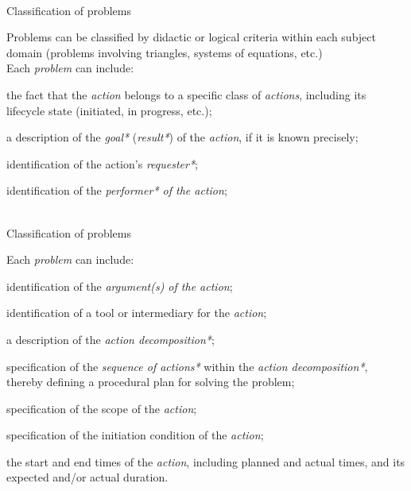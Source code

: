 \begin{frame}{\\Classification of problems}
	\topline
	\justifying

    Problems can be classified by didactic or logical criteria within each subject domain (problems involving triangles, systems of equations, etc.)\\
    \bigskip
    Each \textit{problem} can include:
    \begin{textitemize}
        \item the fact that the \textit{action} belongs to a specific class of \textit{actions}, including its lifecycle state (initiated, in progress, etc.);
        \item a description of the \textit{goal*} (\textit{result*}) of the \textit{action}, if it is known precisely;
        \item identification of the action's \textit{requester*};
        \item identification of the \textit{performer* of the action};
    \end{textitemize}
\end{frame}

\begin{frame}{\\Classification of problems}
	\topline
	\justifying

    \bigskip
    Each \textit{problem} can include:
    \begin{textitemize}
        \item identification of the \textit{argument(s) of the action\scnrolesign};
        \item identification of a tool or intermediary for the \textit{action};
        \item a description of the \textit{action decomposition*};
        \item specification of the \textit{sequence of actions*} within the \textit{action decomposition*}, thereby defining a procedural plan for solving the problem;
        \item specification of the scope of the \textit{action};
        \item specification of the initiation condition of the \textit{action};
        \item the start and end times of the \textit{action}, including planned and actual times, and its expected and/or actual duration.
    \end{textitemize}
\end{frame}

